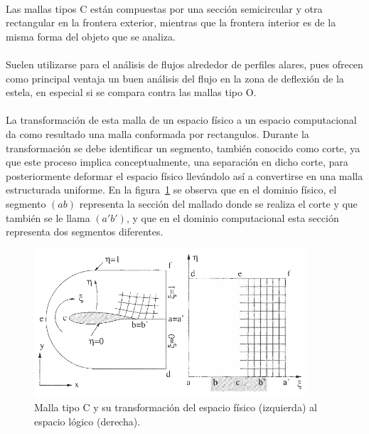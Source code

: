 \documentclass[letterpaper, openright, 12pt]{book}
\begin{document}
    \paragraph*{}
    Las mallas tipos C están compuestas por una sección semicircular y otra
    rectangular en la frontera exterior, mientras que la frontera interior
    es de la misma forma del objeto que se analiza.

    \paragraph*{}
    Suelen utilizarse para el análisis de flujos alrededor de perfiles
    alares, pues ofrecen como principal ventaja un buen análisis del flujo
    en la zona de deflexión de la estela, en especial si se compara contra
    las mallas tipo O.\cite{best-practices-grid-generation}

    \paragraph{}
    La transformación de esta malla de un espacio físico a un espacio
    computacional da como resultado una malla conformada por rectangulos.
    Durante la transformación se debe identificar un segmento, también
    conocido como corte, ya que este proceso implica conceptualmente, una
    separación en dicho corte, para posteriormente deformar el espacio
    físico llevándolo así a convertirse en una malla estructurada uniforme.
    En la figura~\ref{fig:malla-c} se observa que en el dominio físico, el
    segmento $(ab)$ representa la sección del mallado donde se realiza el
    corte y que también se le llama $(a'b')$, y que en el dominio
    computacional esta sección representa dos segmentos diferentes.
    \begin{figure}[htbp!]
        \centering
        \includegraphics[keepaspectratio, width=0.9\textwidth]{./img/malla-c}
        \captionsetup{margin=2cm}
        \caption[Malla tipo C]{Malla tipo C y su transformación del espacio
            físico (izquierda) al espacio lógico (derecha).~\cite{blazek}}
        \label{fig:malla-c}
    \end{figure}
\end{document}
